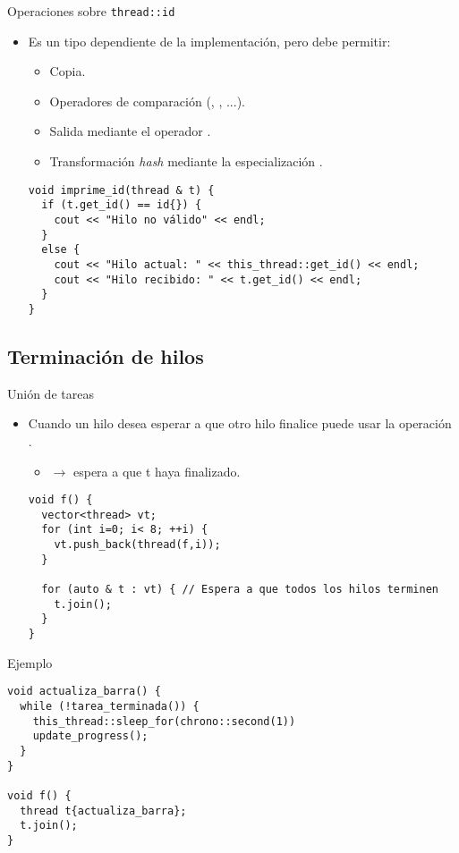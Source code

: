 \begin{frame}[fragile]{Operaciones sobre \texttt{thread::id}}
\begin{itemize}
  \item Es un tipo dependiente de la implementación, pero debe permitir:
    \begin{itemize}
      \item Copia.
      \item Operadores de comparación (\cppid{==}, \cppid{<}, ...).
      \item Salida mediante el operador \cppid{<<}.
      \item Transformación \emph{hash} mediante la especialización .
    \end{itemize}
\begin{lstlisting}
void imprime_id(thread & t) {
  if (t.get_id() == id{}) {
    cout << "Hilo no válido" << endl;
  }
  else {
    cout << "Hilo actual: " << this_thread::get_id() << endl;
    cout << "Hilo recibido: " << t.get_id() << endl;
  }
}
\end{lstlisting}
\end{itemize}
\end{frame}

\subsection{Terminación de hilos}

\begin{frame}[fragile]{Unión de tareas}
\begin{itemize}
  \item Cuando un hilo desea esperar a que otro hilo finalice puede usar la operación .
    \begin{itemize}
      \item {} $\rightarrow$ espera a que t haya finalizado.
    \end{itemize}
\begin{lstlisting}
void f() {
  vector<thread> vt;
  for (int i=0; i< 8; ++i) {
    vt.push_back(thread(f,i));
  }

  for (auto & t : vt) { // Espera a que todos los hilos terminen
    t.join();
  }
}
\end{lstlisting}
\end{itemize}
\end{frame}

\begin{frame}[fragile]{Ejemplo}
\begin{lstlisting}
void actualiza_barra() {
  while (!tarea_terminada()) {
    this_thread::sleep_for(chrono::second(1))
    update_progress();
  }
}

void f() {
  thread t{actualiza_barra};
  t.join();
}
\end{lstlisting}
\end{frame}


